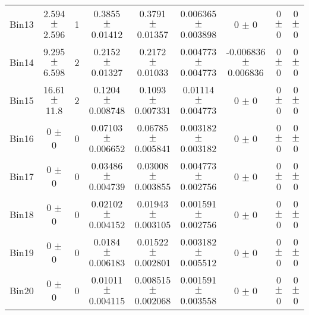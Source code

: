 \begin{tabular}{@{\extracolsep{4pt}}lcccccccc@{}}
     Bin13 & 2.594 $\pm$ 2.596 & 1 & 0.3855 $\pm$ 0.01412 & 0.3791 $\pm$ 0.01357 & 0.006365 $\pm$ 0.003898 & 0 $\pm$ 0 & 0 $\pm$ 0 & 0 $\pm$ 0 \\ 
     Bin14 & 9.295 $\pm$ 6.598 & 2 & 0.2152 $\pm$ 0.01327 & 0.2172 $\pm$ 0.01033 & 0.004773 $\pm$ 0.004773 & -0.006836 $\pm$ 0.006836 & 0 $\pm$ 0 & 0 $\pm$ 0 \\ 
     Bin15 & 16.61 $\pm$ 11.8 & 2 & 0.1204 $\pm$ 0.008748 & 0.1093 $\pm$ 0.007331 & 0.01114 $\pm$ 0.004773 & 0 $\pm$ 0 & 0 $\pm$ 0 & 0 $\pm$ 0 \\ 
     Bin16 & 0 $\pm$ 0 & 0 & 0.07103 $\pm$ 0.006652 & 0.06785 $\pm$ 0.005841 & 0.003182 $\pm$ 0.003182 & 0 $\pm$ 0 & 0 $\pm$ 0 & 0 $\pm$ 0 \\ 
     Bin17 & 0 $\pm$ 0 & 0 & 0.03486 $\pm$ 0.004739 & 0.03008 $\pm$ 0.003855 & 0.004773 $\pm$ 0.002756 & 0 $\pm$ 0 & 0 $\pm$ 0 & 0 $\pm$ 0 \\ 
     Bin18 & 0 $\pm$ 0 & 0 & 0.02102 $\pm$ 0.004152 & 0.01943 $\pm$ 0.003105 & 0.001591 $\pm$ 0.002756 & 0 $\pm$ 0 & 0 $\pm$ 0 & 0 $\pm$ 0 \\ 
     Bin19 & 0 $\pm$ 0 & 0 & 0.0184 $\pm$ 0.006183 & 0.01522 $\pm$ 0.002801 & 0.003182 $\pm$ 0.005512 & 0 $\pm$ 0 & 0 $\pm$ 0 & 0 $\pm$ 0 \\ 
     Bin20 & 0 $\pm$ 0 & 0 & 0.01011 $\pm$ 0.004115 & 0.008515 $\pm$ 0.002068 & 0.001591 $\pm$ 0.003558 & 0 $\pm$ 0 & 0 $\pm$ 0 & 0 $\pm$ 0 \\ 
\hline\hline
  \end{tabular}
